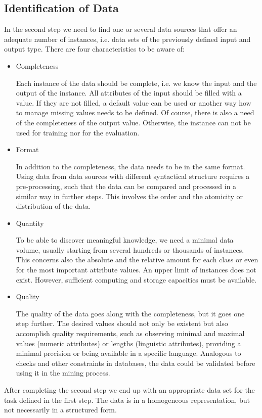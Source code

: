 \documentclass[article,type=msc,colorback,accentcolor=tud7b]{tudthesis}
\begin{document}
  \subsection{Identification of Data}
    In the second step we need to find one or several data sources that offer an adequate number of instances, i.e. data sets of the previously defined input and output type. There are four characteristics to be aware of:
    \begin{itemize}
      \item Completeness
      
        Each instance of the data should be complete, i.e. we know the input and the output of the instance. All attributes of the input should be filled with a value. If they are not filled, a default value can be used or another way how to manage missing values needs to be defined. Of course, there is also a need of the completeness of the output value. Otherwise, the instance can not be used for training nor for the evaluation.
      \item Format
      
        In addition to the completeness, the data needs to be in the same format. Using data from data sources with different syntactical structure requires a pre-processing, such that the data can be compared and processed in a similar way in further steps. This involves the order and the atomicity or distribution of the data.
      \item Quantity
      
        To be able to discover meaningful knowledge, we need a minimal data volume, usually starting from several hundreds or thousands of instances. This concerns also the absolute and the relative amount for each class or even for the most important attribute values. An upper limit of instances does not exist. However, sufficient computing and storage capacities must be available.
      \item Quality
      
        The quality of the data goes along with the completeness, but it goes one step further. The desired values should not only be existent but also accomplish quality requirements, such as observing minimal and maximal values (numeric attributes) or lengths (linguistic attributes), providing a minimal precision or being available in a specific language. Analogous to checks and other constraints in databases, the data could be validated before using it in the mining process.
    \end{itemize}
    After completing the second step we end up with an appropriate data set for the task defined in the first step. The data is in a homogeneous representation, but not necessarily in a structured form.
\end{document}

